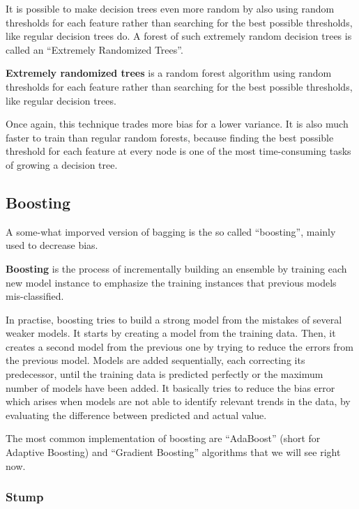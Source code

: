 
It is possible to make decision trees even more random by also using random thresholds for each feature rather than
searching for the best possible thresholds, like regular decision trees do. A forest of such extremely random
decision trees is called an ``Extremely Randomized Trees''.

\textbf{Extremely randomized trees} is a random forest algorithm using random thresholds for each feature rather than
searching for the best possible thresholds, like regular decision trees.
\ed

Once again, this technique trades more bias for a lower variance. It is also much faster to train than regular
random forests, because finding the best possible threshold for each feature at every node is one of the most
time-consuming tasks of growing a decision tree.

\subsection{Boosting}

A some-what imporved version of bagging is the so called ``boosting'', mainly used to decrease bias.

\bd[Boosting]
\textbf{Boosting} is the process of incrementally building an ensemble by training each new model instance to emphasize
the training instances that previous models mis-classified.
\ed

In practise, boosting tries to build a strong model from the mistakes of several weaker models. It starts by
creating a model from the training data. Then, it creates a second model from the previous one by trying to reduce
the errors from the previous model. Models are added sequentially, each correcting its predecessor, until the
training data is predicted perfectly or the maximum number of models have been added. It basically tries to reduce
the bias error which arises when models are not able to identify relevant trends in the data, by evaluating the
difference between predicted and actual value.


The most common implementation of boosting are ``AdaBoost'' (short for Adaptive  Boosting) and ``Gradient Boosting''
algorithms that we will see right now.

\subsubsection{Stump}

